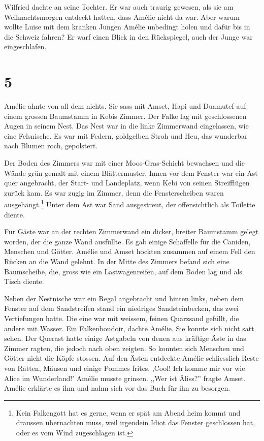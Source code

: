 \documentclass[11pt,titlepage,a5paper]{book}
\begin{document}
Wilfried dachte an seine Tochter. Er war auch traurig gewesen, als sie am Weihnachtsmorgen entdeckt hatten, dass Amélie nicht da war. Aber warum wollte Luise mit dem kranken Jungen Amélie unbedingt holen und dafür bis in die Schweiz fahren? Er warf einen Blick in den Rückspiegel, auch der Junge war eingeschlafen. 

\section*{5}

Amélie ahnte von all dem nichts. Sie sass mit Amset, Hapi und Duamutef auf einem grossen Baumstamm in Kebis Zimmer. Der Falke lag mit geschlossenen Augen in seinem Nest. Das Nest war in die linke Zimmerwand eingelassen, wie eine Felsnische. Es war mit Federn, goldgelben Stroh und Heu, das wunderbar nach Blumen roch, gepolstert.

Der Boden des Zimmers war mit einer Moos-Gras-Schicht bewachsen und die Wände grün gemalt mit einem Blättermuster. Innen vor dem Fenster war ein Ast quer angebracht, der Start- und Landeplatz, wenn Kebi von seinen Streifflügen zurück kam. Es war zugig im Zimmer, denn die Fensterscheiben waren ausgehängt.\footnote{Kein Falkengott hat es gerne, wenn er spät am Abend heim kommt und draussen übernachten muss, weil irgendein Idiot das Fenster geschlossen hat, oder es vom Wind zugeschlagen ist.}  Unter dem Ast war Sand ausgestreut, der offensichtlich als Toilette diente.

Für Gäste war an der rechten Zimmerwand ein dicker, breiter Baumstamm gelegt worden, der die ganze Wand ausfüllte. Es gab einige Schaffelle für die Caniden, Menschen und Götter. Amélie und Amset hockten zusammen auf einem Fell den Rücken an die Wand gelehnt. In der Mitte des Zimmers befand sich eine Baumscheibe, die, gross wie ein Lastwagenreifen, auf dem Boden lag und als Tisch diente.

 Neben der Nestnische war ein Regal angebracht und hinten links, neben dem Fenster auf dem Sandstreifen stand ein niedriges Sandsteinbecken, das zwei Vertiefungen hatte. Die eine war mit weissem, feinen Quarzsand gefüllt, die andere mit Wasser. Ein Falkenboudoir, dachte Amélie. Sie konnte sich nicht satt sehen. Der Querast hatte einige Astgabeln von denen aus kräftige Äste in das Zimmer ragten, die jedoch nach oben zeigten. So konnten sich Menschen und Götter nicht die Köpfe stossen. Auf den Ästen entdeckte Amélie schliesslich Reste von Ratten, Mäusen und einige Pommes frites. ,Cool! Ich komme mir vor wie Alice im Wunderland!' Amélie musste grinsen. ,,Wer ist Äliss?'' fragte Amset. Amélie erklärte es ihm und nahm sich vor das Buch für ihn zu besorgen.
 
\end{document}
